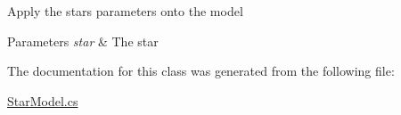 Apply the star\textquotesingle{}s parameters onto the model 


\begin{DoxyParams}{Parameters}
{\em star} & The star\\
\hline
\end{DoxyParams}


The documentation for this class was generated from the following file\+:\begin{DoxyCompactItemize}
\item 
\mbox{\hyperlink{_star_model_8cs}{Star\+Model.\+cs}}\end{DoxyCompactItemize}
